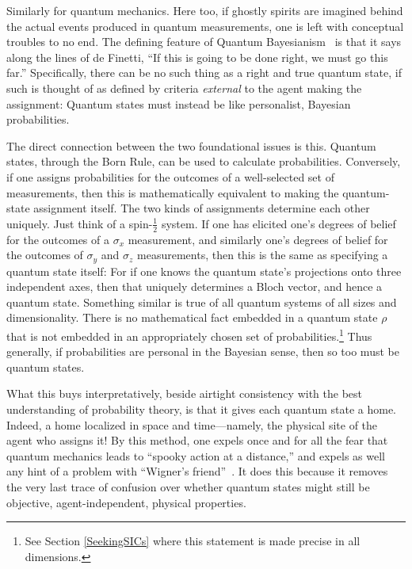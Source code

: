 Similarly for quantum mechanics.  Here too, if ghostly spirits are imagined behind the actual events produced in quantum measurements, one is left with conceptual troubles to no end.  The defining feature of Quantum Bayesianism~\cite{Caves02,Fuchs02,Fuchs04,Caves07,Fuchs09a,Fuchs10} is that it says along the lines of de Finetti, ``If this is going to be done right, we must go this far.''  Specifically, there can be no such thing as a right and true quantum state, if such is thought of as defined by criteria {\it external\/} to the agent making the assignment:  Quantum states must instead be like personalist, Bayesian probabilities.

The direct connection between the two foundational issues is this.  Quantum states, through the Born Rule, can be used to calculate probabilities.  Conversely, if one assigns probabilities for the outcomes of a well-selected set of measurements, then this is mathematically equivalent to making the quantum-state assignment itself.  The two kinds of assignments determine each other uniquely.  Just think of a spin-$\frac{1}{2}$ system.  If one has elicited one's degrees of belief for the outcomes of a $\sigma_x$ measurement, and similarly one's degrees of belief for the outcomes of $\sigma_y$ and $\sigma_z$ measurements, then this is the same as specifying a quantum state itself:  For if one knows the quantum state's projections onto three independent axes, then that uniquely determines a Bloch vector, and hence a quantum state.  Something similar is true of all quantum systems of all sizes and dimensionality.  There is no mathematical fact embedded in a quantum state $\rho$ that is not embedded in an appropriately chosen set of probabilities.\footnote{See Section \ref{SeekingSICs} where this statement is made precise in all dimensions.}  Thus generally, if probabilities are personal in the Bayesian sense, then so too must be quantum states.

What this buys interpretatively, beside airtight consistency with the best understanding of probability theory, is that it gives each quantum state a home.  Indeed, a home localized in space and time---namely, the physical site of the agent who assigns it!  By this method, one expels once and for all the fear that quantum mechanics leads to ``spooky action at a distance,'' and expels as well any hint of a problem with ``Wigner's friend''~\cite{Wigner71}.  It does this because it removes the very last trace of confusion over whether quantum states might still be objective, agent-independent, physical properties.

